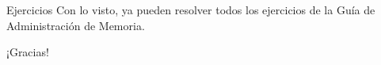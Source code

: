 \documentclass[aspectratio=169]{beamer}
\begin{document}
\begin{frame}{Ejercicios}
    \vfill
    Con lo visto, ya pueden resolver todos los ejercicios de la Guía de Administración de Memoria.
    \vfill
\end{frame}

\begin{frame}[plain]
    \begin{center}
    \vspace{2cm}
    \huge ¡Gracias!\\
    \vspace{2cm}
    \end{center}
\end{frame}
\end{document}
